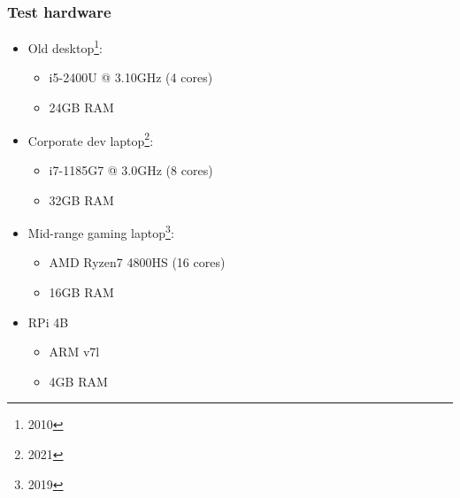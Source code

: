 \documentclass[compress,table,xcolor=table]{beamer}
\begin{document}
\begin{frame}
  \frametitle{Test hardware}
  \larger
  \begin{itemize}
  \item Old desktop\footnote{2010}:
    \begin{itemize}
    \smaller
    \item i5-2400U @ 3.10GHz (4 cores)
    \item 24GB RAM
    \end{itemize}
  \item Corporate dev laptop\footnote{2021}:
    \begin{itemize}
    \smaller
    \item i7-1185G7 @ 3.0GHz (8 cores)
    \item 32GB RAM
    \end{itemize}
  \item Mid-range gaming laptop\footnote{2019}:
    \begin{itemize}
    \smaller
    \item AMD Ryzen7 4800HS (16 cores)
    \item 16GB RAM
    \end{itemize}
  \item RPi 4B
    \begin{itemize}
    \smaller
    \item ARM v7l
    \item 4GB RAM
    \end{itemize}
  \end{itemize}
\end{frame}
\end{document}
